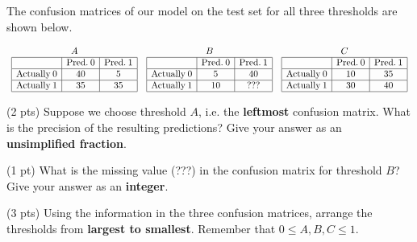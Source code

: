 \documentclass[twoside,12pt]{article}
\begin{document}
\begin{probset}
\begin{prob}[(8 pts)]
The confusion matrices of our model on the test set for all three thresholds are shown below.

\vspace{-0.3in}

\[
\begin{array}{ccc}
\textbf{$A$} & \textbf{$B$} & \textbf{$C$} \\
\begin{array}{|l|c|c|}
\hline
& \text{Pred.} \: 0 & \text{Pred.} \: 1 \\
\hline
\text{Actually} \: 0 & 40 & 5 \\
\hline
\text{Actually} \: 1 & 35 & 35 \\
\hline
\end{array}
&
\begin{array}{|l|c|c|}
\hline
& \text{Pred.} \: 0 & \text{Pred.} \: 1 \\
\hline
\text{Actually} \: 0 & 5 & 40 \\
\hline
\text{Actually} \: 1 & 10 & ??? \\
\hline
\end{array}
&
\begin{array}{|l|c|c|}
\hline
& \text{Pred.} \: 0 & \text{Pred.} \: 1 \\
\hline
\text{Actually} \: 0 & 10 & 35 \\
\hline
\text{Actually} \: 1 & 30 & 40 \\
\hline
\end{array}
\end{array}
\]

\begin{subprobset}

\begin{subprob}(2 pts) Suppose we choose threshold {$A$}, i.e. the \textbf{leftmost} confusion matrix. What is the precision of the resulting predictions? Give your answer as an \textbf{unsimplified fraction}.

\biginlineresponsebox[1.5in]{}

\end{subprob}

\begin{subprob}(1 pt) What is the missing value (???) in the confusion matrix for threshold $B$? Give your answer as an \textbf{integer}.

\inlineresponsebox[1.5in]{}

\end{subprob}

\begin{subprob}(3 pts) Using the information in the three confusion matrices, arrange the thresholds from \textbf{largest to smallest}. Remember that $0 \leq A, B, C \leq 1$.


\end{subprob}
\end{subprobset}
\end{prob}
\end{probset}
\end{document}
